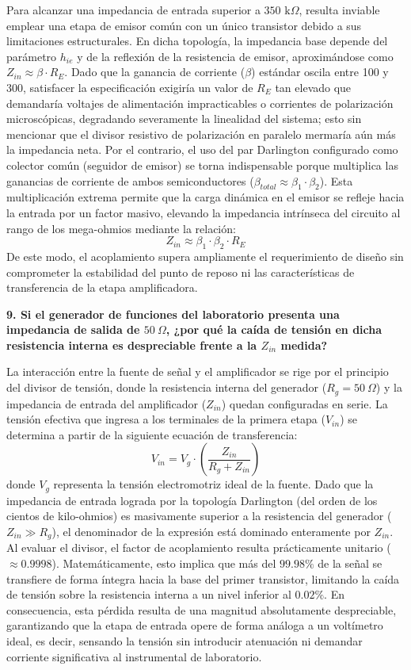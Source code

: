 Para alcanzar una impedancia de entrada superior a $350\text{ k}\Omega$, resulta inviable emplear una etapa de emisor común con un único transistor debido a sus limitaciones estructurales. En dicha topología, la impedancia base depende del parámetro $h_{ie}$ y de la reflexión de la resistencia de emisor, aproximándose como $Z_{in} \approx \beta \cdot R_E$. Dado que la ganancia de corriente ($\beta$) estándar oscila entre 100 y 300, satisfacer la especificación exigiría un valor de $R_E$ tan elevado que demandaría voltajes de alimentación impracticables o corrientes de polarización microscópicas, degradando severamente la linealidad del sistema; esto sin mencionar que el divisor resistivo de polarización en paralelo mermaría aún más la impedancia neta. Por el contrario, el uso del par Darlington configurado como colector común (seguidor de emisor) se torna indispensable porque multiplica las ganancias de corriente de ambos semiconductores ($\beta_{total} \approx \beta_1 \cdot \beta_2$). Esta multiplicación extrema permite que la carga dinámica en el emisor se refleje hacia la entrada por un factor masivo, elevando la impedancia intrínseca del circuito al rango de los mega-ohmios mediante la relación:
$$Z_{in} \approx \beta_1 \cdot \beta_2 \cdot R_E$$
De este modo, el acoplamiento supera ampliamente el requerimiento de diseño sin comprometer la estabilidad del punto de reposo ni las características de transferencia de la etapa amplificadora.

\textbf{9. Si el generador de funciones del laboratorio presenta una impedancia de salida de $50\ \Omega$, ¿por qué la caída de tensión en dicha resistencia interna es despreciable frente a la $Z_{in}$ medida?}

La interacción entre la fuente de señal y el amplificador se rige por el principio del divisor de tensión, donde la resistencia interna del generador ($R_g = 50\ \Omega$) y la impedancia de entrada del amplificador ($Z_{in}$) quedan configuradas en serie. La tensión efectiva que ingresa a los terminales de la primera etapa ($V_{in}$) se determina a partir de la siguiente ecuación de transferencia:
$$V_{in} = V_g \cdot \left( \frac{Z_{in}}{R_g + Z_{in}} \right)$$
donde $V_g$ representa la tensión electromotriz ideal de la fuente. Dado que la impedancia de entrada lograda por la topología Darlington (del orden de los cientos de kilo-ohmios) es masivamente superior a la resistencia del generador ($Z_{in} \gg R_g$), el denominador de la expresión está dominado enteramente por $Z_{in}$. Al evaluar el divisor, el factor de acoplamiento resulta prácticamente unitario ($\approx 0.9998$). Matemáticamente, esto implica que más del $99.98\%$ de la señal se transfiere de forma íntegra hacia la base del primer transistor, limitando la caída de tensión sobre la resistencia interna a un nivel inferior al $0.02\%$. En consecuencia, esta pérdida resulta de una magnitud absolutamente despreciable, garantizando que la etapa de entrada opere de forma análoga a un voltímetro ideal, es decir, sensando la tensión sin introducir atenuación ni demandar corriente significativa al instrumental de laboratorio.

